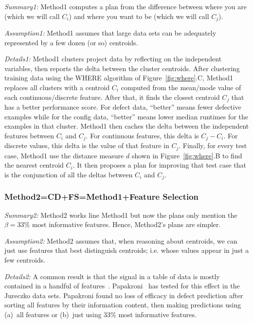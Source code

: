 \documentclass{sig-alternate}
\newcommand{\fig}[1]{Figure~\ref{fig:#1}}
\begin{document}
 {\em Summary1:} Method1  computes a plan from the difference between where you are  (which we will call $C_i$) and
where you want to be  (which we will call $C_j$).

{\em Assumption1: } Method1 assumes that large data sets can be adequately represented by a few dozen (or so) 
centroids.
 
 {\em Details1:} Method1 clusters project data by reflecting   on the independent variables, then
  reports the delta between the cluster centroids. 
  After clustering   training data using the WHERE algorithm of  \fig{where}.C, Method1
replaces all clusters with a  centroid $C_i$ computed from the mean/mode value of each
continuous/discrete feature. After that, it
finds the closest centroid $C_j$ that has a better
performance score. For defect data, ``better'' means fewer defective examples while for the config data,
``better'' means lower median runtimes for the examples in that cluster.
Method1 then caches the  delta between the independent features between $C_i$ and $C_j$. For continuous
features, this delta is $C_j - C_i$. For discrete values, this delta is the value of that feature
in $C_j$. 
Finally, for every test case, Method1 use the distance measure $d$ shown in \fig{where}.B to find
the nearest centroid $C_i$.  It then proposes a plan for improving that test case
that is the conjunction of all the deltas between $C_i$ and $C_j$.


\subsubsection{Method2=CD+FS=Method1+Feature Selection }
 
{\em Summary2:} Method2 works line Method1 but now the   plans  only
mention the $\beta=33\%$ most informative features. Hence, Method2's plans are simpler.

{\em Assumption2: } Method2 assumes that, when reasoning about centroids, we can
just use   features
that   best distinguish    centroids; i.e. whose values appear in just a few centroids.
 

{\em Details2:} A common result is that the signal in a table of data is mostly contained in a handful of features~\cite{hall03,kohavi97}.
Papakroni~\cite{papa13} has tested for this effect in the Jureczko data sets.
Papakroni found no loss of   efficacy in defect prediction after
sorting all features by their information content,
then making predictions using (a)~all  features or (b)~just using   33\% most informative features.
\end{document}
